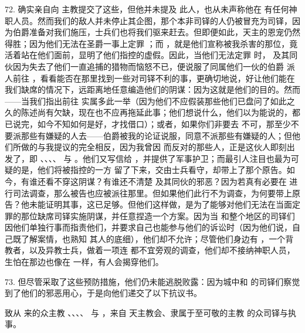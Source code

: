 72.  确实亲自向  主教提交了这些，但他并未提及  此人，也从未声称他在  有任何神职人员。然而我们的敌人并未停止其企图，那个本非司铎的人仍被冒充为司铎，因为伯爵准备对我们施压，士兵们也将我们驱来赶去。但即便如此，天主的恩宠仍然得胜；因为他们无法在圣爵一事上定罪 ；而 ，就是他们宣称被我杀害的那位，竟活着站在他们面前，显明了他们指控的虚假。因此，当他们无法定罪  时， 及其同伙因为失去了他们一直追捕的猎物而恼怒不已，便说服了同属他们一伙的伯爵  派人前往 ，看看能否在那里找到一些对司铎不利的事，更确切地说，好让他们能在我们缺席的情况下，远距离地任意编造他们的阴谋：因为这就是他们的目的。然而——当我们指出前往  实属多此一举（因为他们不应假装那些他们已盘问了如此之久的陈述尚有欠缺，现在也不应再拖延此事；他们想说什么，他们以为能说的，都已说完，如今不知如何是好，才找借口）；或者，如果你们非要去  不可，那至少不要派那些有嫌疑的人去——伯爵被我的论证说服，同意不派那些有嫌疑的人；但他们所做的与我提议的完全相反，因为我曾因  而反对的那些人，正是这伙人即刻出发了，即 、、、、 与 。他们又写信给 ，并提供了军事护卫；而最引人注目也最为可疑的是，他们将被指控的一方  留了下来，交由士兵看守，却带上了那个原告。如今，有谁还看不穿这阴谋？有谁还不清楚  及其同伙的邪恶？因为若真有必要在  进行司法调查，那么被告也应被派往那里。但如果他们此行不为调查，为何要带上原告？他未能证明其事，这已足够。但他们这样做，是为了能够对他们无法在当面定罪的那位缺席司铎实施阴谋，并任意捏造一个方案。因为当  和整个地区的司铎们因他们单独行事而指责他们，并要求自己也能参与他们的诉讼时（因为他们说，自己既了解案情，也熟知  其人的底细），他们却不允许；尽管他们身边有  ，一个背教者，以及异教士兵，做着一项连  都不宜旁观的调查，他们却不接纳神职人员，生怕在那边也像在  一样，有人会揭穿他们。\par

73. 但尽管采取了这些预防措施，他们仍未能逃脱败露：因为城中和  的司铎们察觉到了他们的邪恶用心，于是向他们递交了以下抗议书。\par

致从  来的众主教 、、、、 与 ，来自  天主教会、隶属于至可敬的主教  的众司铎与执事。\par


